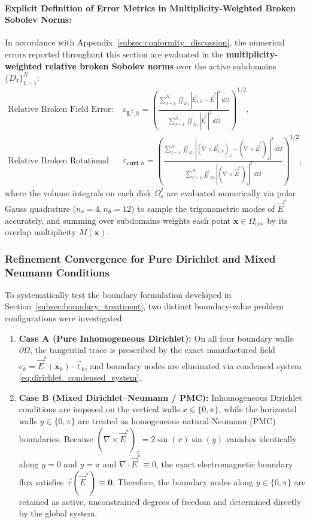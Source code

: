 \documentclass[VANCOUVER,Times1COL]{WileyNJD-v5}
\begin{document}
\paragraph*{Explicit Definition of Error Metrics in Multiplicity-Weighted Broken Sobolev Norms:}
In accordance with Appendix~\ref{subsec:conformity_discussion}, the numerical errors reported throughout this section are evaluated in the \textbf{multiplicity-weighted relative broken Sobolev norms} over the active subdomains $\{D_I\}_{I=1}^N$:
\begin{align}
    \text{Relative Broken Field Error: } \quad & \varepsilon_{\boldsymbol{L}^2, h} = \left( \frac{\sum_{I=1}^N \iint_{D_I} |\vec{E}_{I,h} - \vec{E}^*|^2 \, d\Omega}{\sum_{I=1}^N \iint_{D_I} |\vec{E}^*|^2 \, d\Omega} \right)^{1/2}, \label{eq:mms_broken_L2} \\
    \text{Relative Broken Rotational Error: } \quad & \varepsilon_{\mathbf{curl}, h} = \left( \frac{\sum_{I=1}^N \iint_{D_I} |(\nabla \times \vec{E}_{I,h})_z - (\nabla \times \vec{E}^*)_z|^2 \, d\Omega}{\sum_{I=1}^N \iint_{D_I} |(\nabla \times \vec{E}^*)_z|^2 \, d\Omega} \right)^{1/2}, \label{eq:mms_broken_curl}
\end{align}
where the volume integrals on each disk $\Omega_s^I$ are evaluated numerically via polar Gauss quadrature ($n_r=4, n_\theta=12$) to sample the trigonometric modes of $\vec{E}^*$ accurately, and summing over subdomains weights each point $\mathbf{x} \in \Omega_{\mathrm{cov}}$ by its overlap multiplicity $M(\mathbf{x})$.

\subsubsection{Refinement Convergence for Pure Dirichlet and Mixed Neumann Conditions}
\label{subsubsec:mms_dirichlet_neumann}

To systematically test the boundary formulation developed in Section~\ref{subsec:boundary_treatment}, two distinct boundary-value problem configurations were investigated:
\begin{enumerate}
    \item \textbf{Case A (Pure Inhomogeneous Dirichlet):} On all four boundary walls $\partial\Omega$, the tangential trace is prescribed by the exact manufactured field $e_k = \vec{E}^*(\mathbf{x}_k) \cdot \vec{t}_k$, and boundary nodes are eliminated via condensed system \eqref{eq:dirichlet_condensed_system}.
    \item \textbf{Case B (Mixed Dirichlet--Neumann / PMC):} Inhomogeneous Dirichlet conditions are imposed on the vertical walls $x \in \{0, \pi\}$, while the horizontal walls $y \in \{0, \pi\}$ are treated as homogeneous natural Neumann (PMC) boundaries. Because $(\nabla \times \vec{E}^*)_z = 2\sin(x)\sin(y)$ vanishes identically along $y=0$ and $y=\pi$ and $\nabla \cdot \vec{E}^* \equiv 0$, the exact electromagnetic boundary flux satisfies $\vec{\tau}(\vec{E}^*) \equiv \mathbf{0}$. Therefore, the boundary nodes along $y \in \{0, \pi\}$ are retained as active, unconstrained degrees of freedom and determined directly by the global system.
\end{enumerate}
\end{document}
